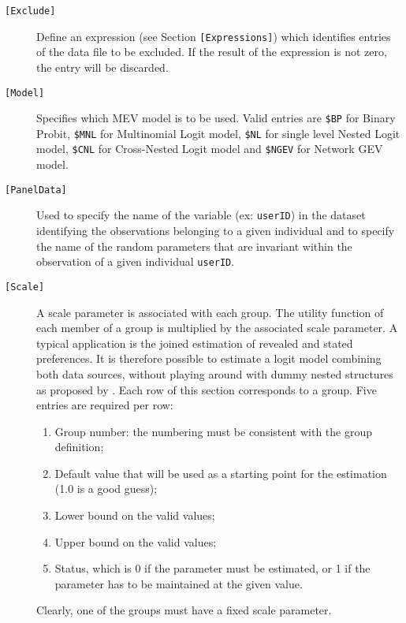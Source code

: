 \documentclass[12pt,a4paper]{article}
\newcommand{\specitem}[1]{\texttt{[#1]}}
\begin{document}
\begin{description}
   \item[\specitem{Exclude}] Define an expression (see
      Section \verb+[Expressions]+) which identifies entries of
      the data file to be excluded. If the result of the expression is not
      zero, the entry will be discarded.  

   \item[\specitem{Model}] Specifies which MEV model is to be used. Valid
      entries are \verb+$BP+ for Binary Probit, \verb+$MNL+ for Multinomial Logit model,
      \verb+$NL+ for single level Nested Logit model, 
      \verb+$CNL+ for Cross-Nested Logit model and \verb+$NGEV+ for Network GEV
      model.

   \item[\specitem{PanelData}] Used to specify the name of the variable (ex: \verb+userID+) in the dataset 
      identifying the observations belonging to a given individual and to specify the 
      name of the random parameters that are invariant within the observation of a given individual 
      \verb+userID+.

   \item[\specitem{Scale}] A scale parameter is associated with each group. The
      utility function of each member of a group is multiplied by the associated
      scale parameter. A typical application is the joined estimation of revealed
      and stated preferences. It is therefore possible to estimate a
      logit model combining
      both data sources, without playing around with dummy nested structures as
      proposed by . Each row of this section corresponds to a
      group. Five entries are required per row:
      \begin{enumerate}
         \item Group number: the numbering must be consistent with the
            group definition;
         \item Default value that will be used as a starting point for the estimation
            (1.0 is a good guess);
         \item Lower bound on the valid values;
         \item Upper bound on the valid values;
         \item Status, which is 0 if the parameter must be estimated, or 1 if the parameter has to be maintained at the given value. 
      \end{enumerate}
      Clearly, one of the groups must have a fixed scale parameter. 


\end{description}
\end{document}

